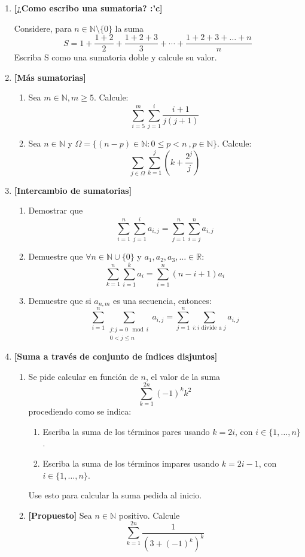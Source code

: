 \documentclass[letterpaper,11pt]{article}
\newcommand{\R}{\mathbb R}
\newcommand{\N}{\mathbb N}
\theoremstyle{plain}
\begin{document}
\begin{enumerate}[\bf P1.]
    \item \textbf{[¿Como escribo una sumatoria? :'c]}
    
        Considere, para $n\in \N \setminus \{0\}$ la suma
    $$ S=1+\dfrac{1+2}{2}+\dfrac{1+2+3}{3}+\cdots+\dfrac{1+2+3+\dots+n}{n} $$
    Escriba S como una sumatoria doble y calcule su valor.
    
    \item \textbf{[Más sumatorias]}
        \begin{enumerate}
            \item Sea $m\in \N, m\geq 5$. Calcule:
            $$\displaystyle \sum_{i=5}^{m} \sum_{j=1}^{i}\dfrac{i+1}{j(j+1)}$$
            
            \item Sea $n \in \N$ y $\Omega = \{(n-p)\in \N: 0\leq p< n ~,p\in \N \}$. Calcule:
            $$\displaystyle \sum_{j\in \Omega} \sum_{k=1}^{j}(k+\dfrac{2^j}{j})$$
        \end{enumerate}
        
    \item \textbf{[Intercambio de sumatorias]}
        \begin{enumerate}
            \item Demostrar que 
                $$\sum_{i=1}^n \sum_{j=1}^i a_{i,j}=\sum_{j=1}^n \sum_{i=j}^n a_{i,j}$$
            \item Demuestre que $\forall n \in \N \cup \{0\}$ y $a_1,a_2,a_3,\ldots\in \R$:
                $$
                \sum_{k=1}^n \sum_{i=1}^k a_i =\sum_{i=1}^n (n-i+1)a_i 
                $$
            \item Demuestre que si $a_{n,m}$ es una secuencia, entonces:
                $$
                \displaystyle \sum_{i=1}^n \sum_{\substack{j: j=0 \mod i \\ 0<j\leq n}} a_{i,j} = \sum_{j=1}^n \sum_{i: i \text{ divide a }j}a_{i,j}
                $$

        \end{enumerate}
    \item \textbf{[Suma a través de conjunto de índices disjuntos]} 
    \begin{enumerate}
        \item Se pide calcular en función de $n$, el valor de la suma
        $$\displaystyle \sum_{k=1}^{2n}(-1)^{k}k^{2} $$
        procediendo como se indica:
        \begin{enumerate}
            \item Escriba la suma de los términos pares usando $k=2i$, con $i \in \{1,\dots,n \}$.
            \item Escriba la suma de los términos impares usando $k=2i-1$, con $i \in \{1,\dots,n \}$.
        \end{enumerate}
        Use esto para calcular la suma pedida al inicio.
        \item \textbf{[Propuesto]} Sea $n\in \N$ positivo. Calcule
        $$\displaystyle \sum_{k=1}^{2n} \frac{1}{(3+(-1)^k)^{k}}  $$
    \end{enumerate}
    
\end{enumerate}
\end{document}
